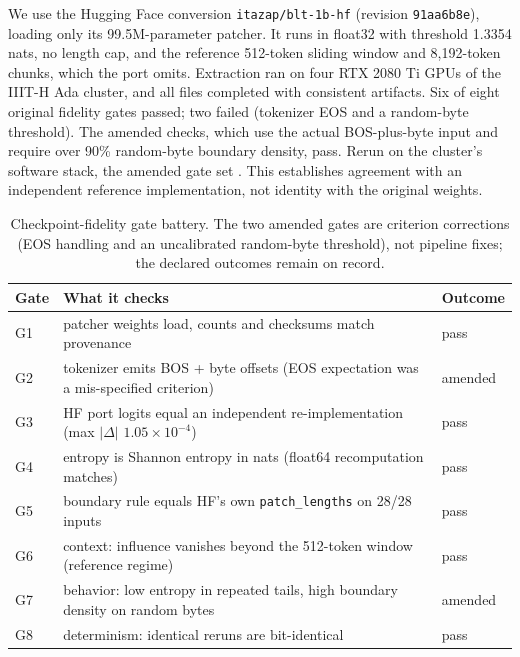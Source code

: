 We use the Hugging Face conversion \texttt{itazap/blt-1b-hf} (revision \texttt{91aa6b8e}), loading only its 99.5M-parameter patcher. It runs in float32 with threshold 1.3354 nats, no length cap, and the reference 512-token sliding window and 8{,}192-token chunks, which the port omits. Extraction ran on four RTX 2080 Ti GPUs of the IIIT-H Ada cluster, and all \nExtracted{} files completed with consistent artifacts. Six of eight original fidelity gates passed; two failed (tokenizer EOS and a random-byte threshold). The amended checks, which use the actual BOS-plus-byte input and require over 90\% random-byte boundary density, pass. Rerun on the cluster's software stack, the amended gate set \FidelityAda{}. This establishes agreement with an independent reference implementation, not identity with the original weights.

\begin{table}[t]
\centering
\begin{tabular}{lll}
\toprule
Gate & What it checks & Outcome \\
\midrule
G1 & patcher weights load, counts and checksums match provenance & pass \\
G2 & tokenizer emits BOS + byte offsets (EOS expectation was a mis-specified criterion) & amended \\
G3 & HF port logits equal an independent re-implementation (max $|\Delta|$ $1.05\times10^{-4}$) & pass \\
G4 & entropy is Shannon entropy in nats (float64 recomputation matches) & pass \\
G5 & boundary rule equals HF's own \texttt{patch\_lengths} on 28/28 inputs & pass \\
G6 & context: influence vanishes beyond the 512-token window (reference regime) & pass \\
G7 & behavior: low entropy in repeated tails, high boundary density on random bytes & amended \\
G8 & determinism: identical reruns are bit-identical & pass \\
\bottomrule
\end{tabular}
\caption{Checkpoint-fidelity gate battery. The two amended gates are criterion corrections (EOS handling and an uncalibrated random-byte threshold), not pipeline fixes; the declared outcomes remain on record.}
\label{tab:fidelity}
\end{table}

